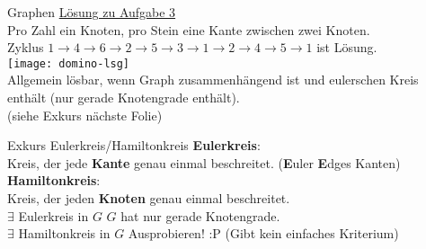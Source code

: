 \begin{frame}{Graphen}
	\underline{Lösung zu Aufgabe 3} \\
	Pro Zahl ein Knoten, pro Stein eine Kante zwischen zwei Knoten. \\
	Zyklus $1 \rightarrow 4 \rightarrow 6 \rightarrow 2 \rightarrow 5 \rightarrow 3 \rightarrow 1 \rightarrow 2 \rightarrow 4 \rightarrow 5 \rightarrow 1$ ist Lösung. \\
	\texttt{[image: domino-lsg]} \\
	\pause
	Allgemein lösbar, wenn Graph zusammenhängend ist und eulerschen Kreis enthält (\gdw nur gerade Knotengrade enthält). \\
	{\small (siehe Exkurs nächste Folie)}
\end{frame}

\begin{frame}{Exkurs Eulerkreis/Hamiltonkreis}
	\textbf{Eulerkreis}: \\
	Kreis, der jede \textbf{Kante} genau einmal beschreitet. {\small (\textbf{E}uler \impl \textbf{E}dges \impl Kanten)} \\
	\forcenewline
	\pause
	\textbf{Hamiltonkreis}: \\
	Kreis, der jeden \textbf{Knoten} genau einmal beschreitet. \\
	\forcenewline
	\pause
	$\exists$ Eulerkreis in $G$ \gdw $G$ hat nur gerade Knotengrade. \\
	$\exists$ Hamiltonkreis in $G$ \gdw Ausprobieren! :P (Gibt kein einfaches Kriterium)
\end{frame}


